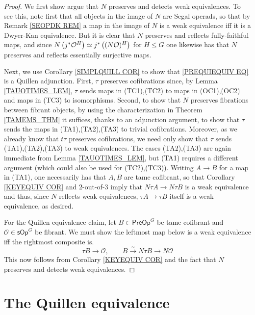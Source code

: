 \documentclass[a4paper,10pt
,draft
]{article}%
\numberwithin{equation}{section}
\numberwithin{figure}{section}
\theoremstyle{definition} %
\renewcommand{\O}{\ensuremath{\mathcal O}}
\newcommand{\1}{\ensuremath{\mathbbm 1}}%
\begin{document}
\begin{proof}
	We first show argue that $N$ preserves and detects weak equivalences.
	To see this, note first that all objects in the image of $N$ are Segal operads, so that by Remark \ref{SEOPDK REM} a map in the image of $N$ is a weak equivalence iff it is a Dwyer-Kan equivalence.
	But it is clear that $N$ preserves and reflects fully-faithful maps,
	and since
	$N \left(j^{\**} \O^H \right)
	\simeq
	j^{\**} \left( (N \O)^H \right)$
	for $H\leq G$
	one likewise has that 
	$N$ preserves and reflects essentially surjective maps.
	
	Next, we use Corollary \ref{SIMPLQUILL COR}
	to show that \eqref{PREQUIEQUIV EQ}
	is a Quillen adjunction.
	First,
	$\tau$ preserves cofibrations since,
	by Lemma \ref{TAUOTIMES_LEM},
	$\tau$ sends maps in (TC1),(TC2) to maps in (OC1),(OC2)
	and maps in (TC3) to isomorphisms.
	Second, to show that $N$ preserves fibrations between fibrant objects,
	by using the characterization in Theorem \ref{TAMEMS_THM}
	it suffices, thanks to an adjunction argument,
	to show that $\tau$
	sends the maps in (TA1),(TA2),(TA3)
	to trivial cofibrations. 
	Moreover, as we already know that $t\tau$ preserves cofibrations, we need only show 	that $\tau$
	sends (TA1),(TA2),(TA3)
	to weak equivalences.
	The cases (TA2),(TA3) are again immediate 
	from Lemma \ref{TAUOTIMES_LEM},
	but (TA1) requires a different argument
	(which could also be used for (TC2),(TC3)).
	Writing $A \to B$ for a map in (TA1), one necessarily has that $A,B$ are tame cofibrant, so that
	Corollary \ref{KEYEQUIV COR}
	and $2$-out-of-$3$ imply that 
	$N \tau A \to N \tau B$ is a weak equivalence
	and thus, since $N$ reflects weak equivalences,
	$\tau A \to \tau B$ itself is a weak equivalence,
	as desired.
	
	For the Quillen equivalence claim, 
	let $B \in \mathsf{PreOp}^G$ be tame cofibrant and
	$\mathcal{O} \in \mathsf{sOp}^G$ be fibrant.
	We must show the leftmost map below is a weak equivalence iff 
	the rightmost composite is.
	\[
	\tau B \to \mathcal{O},
	\qquad
	B \xrightarrow{\sim} N \tau B \to N \mathcal{O}
	\]
	This now follows from Corollary \ref{KEYEQUIV COR}
	and the fact that $N$ preserves and detects weak equivalences.
\end{proof}








\section{The Quillen equivalence}
\label{QE_SEC}
\end{document}
